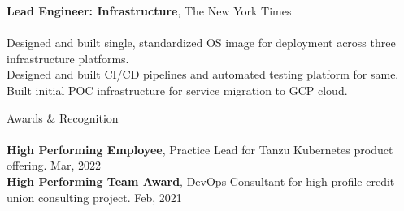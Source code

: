 \documentclass[letterpaper]{article}
\newcommand{\lineunder} {
    \vspace*{-8pt} \\
    \hspace*{-18pt} \hrulefill \\
}
\newcommand{\header} [1] {
    {\hspace*{-18pt}\vspace*{6pt} #1}
    \vspace*{-6pt} \lineunder
}
\begin{document}
{\textbf{Lead Engineer: Infrastructure}, The New York Times} \\
\hspace{5mm}{\sl (Terraform, Puppet, Packer, Vault, Git, Python, Travis,
  Jenkins, Postgres)} \\
Designed and built single, standardized OS image for deployment across three
  infrastructure platforms. \\
Designed and built CI/CD pipelines and automated testing platform for same. \\
Built initial POC infrastructure for service migration to GCP cloud. \\
\vspace*{2mm}

\header{Awards \& Recognition}

%
%
%
%

\textbf{High Performing Employee}, Practice Lead for Tanzu Kubernetes product
offering. \hfill Mar, 2022\\

\textbf{High Performing Team Award}, DevOps Consultant for high profile credit
union consulting project. \hfill Feb, 2021\\
\end{document}
